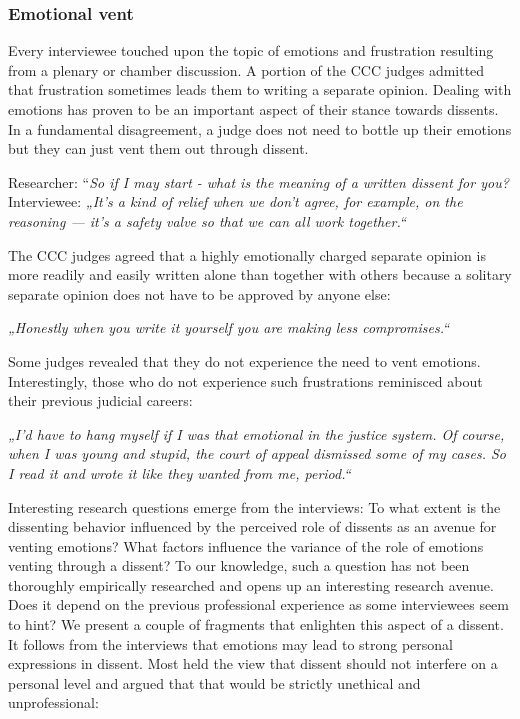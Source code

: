 \documentclass[
  11pt,
]{article}
\begin{document}
\subsubsection{Emotional vent}\label{emotional-vent}

Every interviewee touched upon the topic of emotions and frustration resulting from a plenary or chamber discussion. A portion of the CCC judges admitted that frustration sometimes leads them to writing a separate opinion. Dealing with emotions has proven to be an important aspect of their stance towards dissents. In a fundamental disagreement, a judge does not need to bottle up their emotions but they can just vent them out through dissent.

Researcher: ``\emph{So if I may start - what is the meaning of a written dissent for you?}
Interviewee: \emph{„It's a kind of relief when we don't agree, for example, on the reasoning --- it's a safety valve so that we can all work together.``}

The CCC judges agreed that a highly emotionally charged separate opinion is more readily and easily written alone than together with others because a solitary separate opinion does not have to be approved by anyone else:

\emph{„Honestly when you write it yourself you are making less compromises.``}

Some judges revealed that they do not experience the need to vent emotions. Interestingly, those who do not experience such frustrations reminisced about their previous judicial careers:

\emph{„I'd have to hang myself if I was that emotional in the justice system. Of course, when I was young and stupid, the court of appeal dismissed some of my cases. So I read it and wrote it like they wanted from me, period.``}

Interesting research questions emerge from the interviews: To what extent is the dissenting behavior influenced by the perceived role of dissents as an avenue for venting emotions? What factors influence the variance of the role of emotions venting through a dissent? To our knowledge, such a question has not been thoroughly empirically researched and opens up an interesting research avenue. Does it depend on the previous professional experience as some interviewees seem to hint? We present a couple of fragments that enlighten this aspect of a dissent. It follows from the interviews that emotions may lead to strong personal expressions in dissent. Most held the view that dissent should not interfere on a personal level and argued that that would be strictly unethical and unprofessional:
\end{document}
